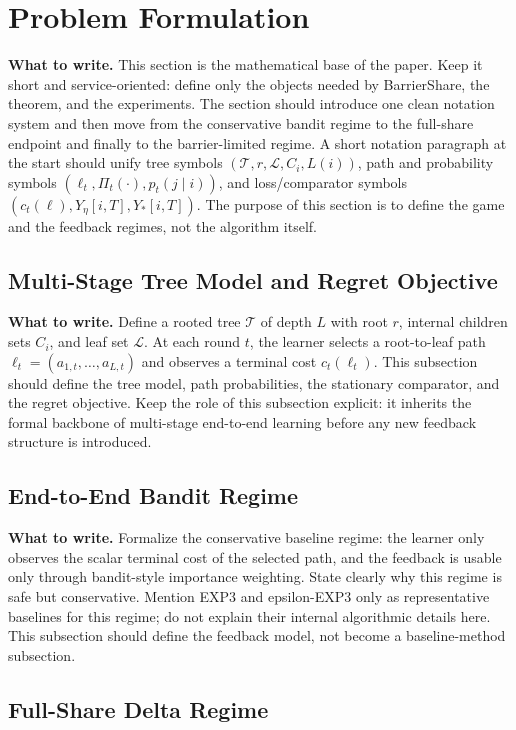 \documentclass{article}
\newcommand{\towrite}[1]{\noindent\textbf{What to write.} #1}
\begin{document}
\section{Problem Formulation}

\towrite{This section is the mathematical base of the paper. Keep it short and service-oriented: define only the objects needed by BarrierShare, the theorem, and the experiments. The section should introduce one clean notation system and then move from the conservative bandit regime to the full-share endpoint and finally to the barrier-limited regime. A short notation paragraph at the start should unify tree symbols $(\mathcal{T}, r, \mathcal{L}, C_i, L(i))$, path and probability symbols $(\ell_t, \Pi_t(\cdot), p_t(j \mid i))$, and loss/comparator symbols $(c_t(\ell), Y_\eta[i,T], Y_\ast[i,T])$. The purpose of this section is to define the game and the feedback regimes, not the algorithm itself.}

\subsection{Multi-Stage Tree Model and Regret Objective}

\towrite{Define a rooted tree $\mathcal{T}$ of depth $L$ with root $r$, internal children sets $C_i$, and leaf set $\mathcal{L}$. At each round $t$, the learner selects a root-to-leaf path $\ell_t=(a_{1,t},\ldots,a_{L,t})$ and observes a terminal cost $c_t(\ell_t)$. This subsection should define the tree model, path probabilities, the stationary comparator, and the regret objective. Keep the role of this subsection explicit: it inherits the formal backbone of multi-stage end-to-end learning before any new feedback structure is introduced.}

\subsection{End-to-End Bandit Regime}

\towrite{Formalize the conservative baseline regime: the learner only observes the scalar terminal cost of the selected path, and the feedback is usable only through bandit-style importance weighting. State clearly why this regime is safe but conservative. Mention EXP3 and epsilon-EXP3 only as representative baselines for this regime; do not explain their internal algorithmic details here. This subsection should define the feedback model, not become a baseline-method subsection.}

\subsection{Full-Share Delta Regime}
\end{document}
